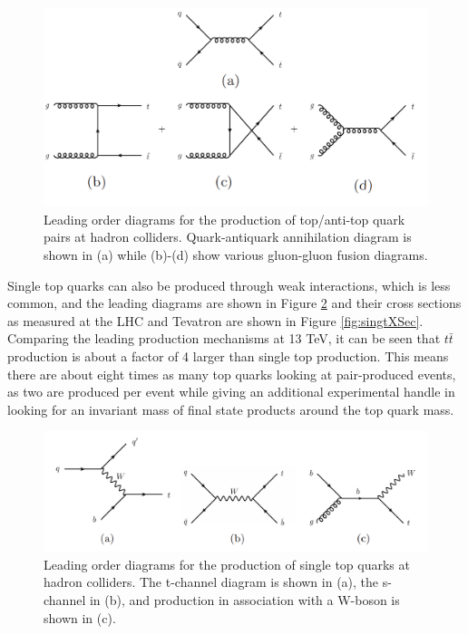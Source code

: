 \begin{figure}[h!]
	\centering
	\includegraphics[width=\columnwidth]{../ThesisImages/Theory/LOPairProdDiags.png}
	\caption[Leading order diagrams for $t\bar{t}$ production at hadron colliders.]{Leading order diagrams for the production of top/anti-top quark pairs at hadron colliders.  Quark-antiquark annihilation diagram is shown in (a) while (b)-(d) show various gluon-gluon fusion diagrams.}
	\label{fig:LOprod}
\end{figure}

Single top quarks can also be produced through weak interactions, which is less common, and the leading diagrams are shown in Figure \ref{fig:LOprodSing} and their cross sections as measured at the LHC and Tevatron are shown in Figure \ref{fig:singtXSec}.  Comparing the leading production mechanisms at 13 TeV, it can be seen that $t\bar{t}$ production is about a factor of 4 larger than single top production.  This means there are about eight times as many top quarks looking at pair-produced events, as two are produced per event while giving an additional experimental handle in looking for an invariant mass of final state products around the top quark mass.

\begin{figure}[h!]
	\centering
	\includegraphics[width=\columnwidth]{../ThesisImages/Theory/LOSingProdDiags.png}
	\caption[Leading order diagrams for single top quark production.]{Leading order diagrams for the production of single top quarks at hadron colliders.  The t-channel diagram is shown in (a), the s-channel in (b), and production in association with a W-boson is shown in (c).}
	\label{fig:LOprodSing}
\end{figure}

